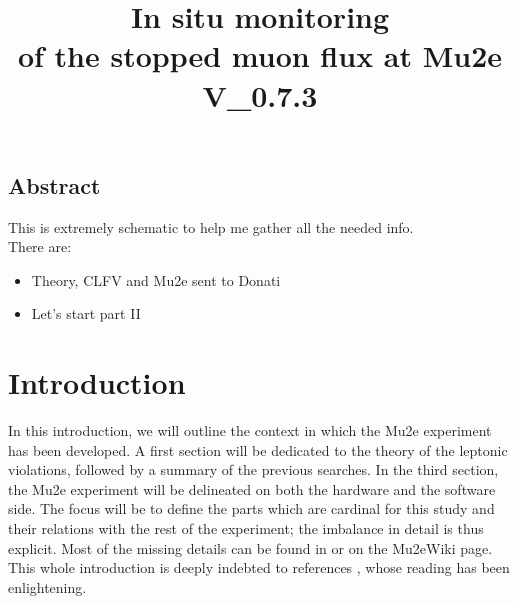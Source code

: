 \documentclass[12pt,a4paper,openright, oneside, titlepage]{book} %
\title{In situ monitoring\\ of the stopped muon flux at Mu2e\\\textbf{V\_0.7.3}}
\begin{document}
\frontmatter
	\begin{frontespizio}

	\end{frontespizio}

\maketitle
\chapter*{Abstract}
This is extremely schematic to help me gather all the needed info.\\
There are:
\begin{itemize}
\item Theory, CLFV and Mu2e sent to Donati
\item Let's start part II
\end{itemize}

\tableofcontents
\mainmatter
\part{Introduction}
In this introduction, we will outline the context in which the Mu2e experiment has been developed. A first section will be dedicated to the theory of the leptonic violations, followed by a summary of the previous searches. In the third section, the Mu2e experiment will be delineated on both the hardware and the software side. The focus will be  to define the parts which are cardinal for this study and their relations with the rest of the experiment; the imbalance in detail is thus explicit. Most of the missing details can be found in \cite{MTDR} or on the Mu2eWiki page.
This whole introduction is deeply indebted to references \cite{signorelli} \cite{bob_cflv} \cite{bob_mu2e} \cite{Manolis}, whose reading has been enlightening.
\end{document}

